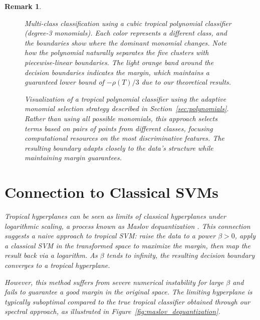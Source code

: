 \documentclass{article}
\newtheorem{remark}{Remark}
\begin{document}
\begin{remark}
\vspace*{2em}
\begin{figure}[ht!]
    \centering
    \resizebox{0.9\textwidth}{!}{\clipbox{0.15\width{} 0.30\height{} 0.15\width{} 0.30\height{}}{}}
    \caption{Multi-class classification using a cubic tropical polynomial classifier (degree-3 monomials). Each color represents a different class, and the boundaries show where the dominant monomial changes. Note how the polynomial naturally separates the five clusters with piecewise-linear boundaries. The light orange band around the decision boundaries indicates the margin, which maintains a guaranteed lower bound of $-\rho(T)/3$ due to our theoretical results.}
    \label{fig:homogeneous_selection}
\end{figure}
\vspace*{4em}
\begin{figure}[ht!]
    \centering
    \resizebox{0.9\textwidth}{!}{\clipbox{0.15\width{} 0.30\height{} 0.15\width{} 0.30\height{}}{}}
    \caption{Visualization of a tropical polynomial classifier using the adaptive monomial selection strategy described in Section~\ref{sec:polynomials}. Rather than using all possible monomials, this approach selects terms based on pairs of points from different classes, focusing computational resources on the most discriminative features. The resulting boundary adapts closely to the data's structure while maintaining margin guarantees.}
    \label{fig:adaptive_polynomial}
\end{figure}
\vspace*{2em}


\newpage
\section{Connection to Classical SVMs}\label{sec:maslov}
Tropical hyperplanes can be seen as limits of classical hyperplanes under logarithmic scaling, a process known as Maslov dequantization \cite{viro2001}. This connection suggests a naive approach to tropical SVM: raise the data to a power $\beta > 0$, apply a classical SVM in the transformed space to maximize the margin, then map the result back via a logarithm. As $\beta$ tends to infinity, the resulting decision boundary converges to a tropical hyperplane.

However, this method suffers from severe numerical instability for large $\beta$ and fails to guarantee a good margin in the original space. The limiting hyperplane is typically suboptimal compared to the true tropical classifier obtained through our spectral approach, as illustrated in Figure~\ref{fig:maslov_dequantization}.


\end{remark}
\end{document}
